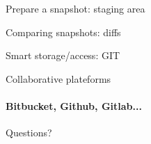 \documentclass[english]{slides}
\begin{document}
\begin{frame}{Prepare a snapshot: staging area}
\end{frame}


\begin{frame}{Comparing snapshots: diffs}
\end{frame}


\begin{frame}{Smart storage/access: GIT}



\end{frame}


\begin{frame}{Collaborative plateforms }
\framesubtitle{Bitbucket, Github, Gitlab...}
\end{frame}


\begin{frame}
\begin{center}\huge
Questions?
\end{center}
\end{frame}
\end{document}
